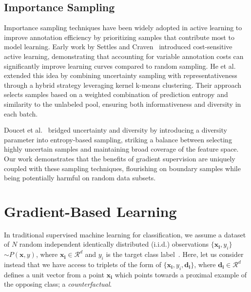 \documentclass[sigconf,anonymous]{aamas}
\begin{document}
\subsection{Importance Sampling}
Importance sampling techniques have been widely adopted in active learning to improve annotation efficiency by prioritizing samples that contribute most to model learning. Early work by Settles and Craven~\cite{settles2008active} introduced cost-sensitive active learning, demonstrating that accounting for variable annotation costs can significantly improve learning curves compared to random sampling. He et al.~\cite{he2014active} extended this idea by combining uncertainty sampling with representativeness through a hybrid strategy leveraging kernel k-means clustering. Their approach selects samples based on a weighted combination of prediction entropy and similarity to the unlabeled pool, ensuring both informativeness and diversity in each batch.

Doucet et al.~\cite{doucet2024bridging} bridged uncertainty and diversity by introducing a diversity parameter into entropy-based sampling, striking a balance between selecting highly uncertain samples and maintaining broad coverage of the feature space. Our work demonstrates that the benefits of gradient supervision are uniquely coupled with these sampling techniques, flourishing on boundary samples while being potentially harmful on random data subsets.

\section{Gradient-Based Learning}
In traditional supervised machine learning for classification, we assume a dataset of $N$ random independent identically distributed (i.i.d.) observations {$\{\mathbf{x_i}, y_i\}$} $\sim P(\mathbf{x},y)$, where $\mathbf{x_i}\in\mathcal{R}^d$ and $y_i$ is the target class label~\cite{hastie2009elements}. Here, let us consider instead that we have access to triplets of the form of {$\{\mathbf{x_i}, y_i, \mathbf{d_i}\}$}, where $\mathbf{d_i}\in\mathcal{R}^d$ defines a unit vector from a point $\mathbf{x_i}$ which points towards a proximal example of the opposing class; a \emph{counterfactual}.
\end{document}
